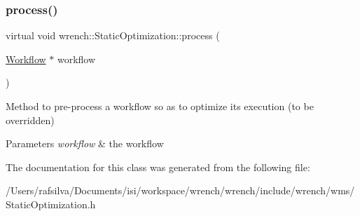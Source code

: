 \subsubsection{\texorpdfstring{process()}{process()}}
{\footnotesize\ttfamily virtual void wrench\+::\+Static\+Optimization\+::process (\begin{DoxyParamCaption}\item[{\hyperlink{classwrench_1_1_workflow}{Workflow} $\ast$}]{workflow }\end{DoxyParamCaption})\hspace{0.3cm}{\ttfamily [pure virtual]}}



Method to pre-\/process a workflow so as to optimize its execution (to be overridden) 


\begin{DoxyParams}{Parameters}
{\em workflow} & the workflow \\
\hline
\end{DoxyParams}


The documentation for this class was generated from the following file\+:\begin{DoxyCompactItemize}
\item 
/\+Users/rafsilva/\+Documents/isi/workspace/wrench/wrench/include/wrench/wms/Static\+Optimization.\+h\end{DoxyCompactItemize}
